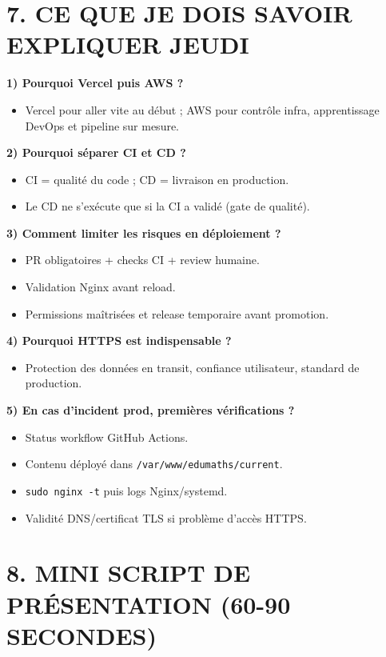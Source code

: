 \documentclass[10pt,a4paper]{article}
\begin{document}
\section{7. CE QUE JE DOIS SAVOIR EXPLIQUER JEUDI}

\textbf{1) Pourquoi Vercel puis AWS ?}
\begin{itemize}
  \item Vercel pour aller vite au d\'ebut ; AWS pour contr\^ole infra, apprentissage DevOps et pipeline sur mesure.
\end{itemize}

\textbf{2) Pourquoi s\'eparer CI et CD ?}
\begin{itemize}
  \item CI = qualit\'e du code ; CD = livraison en production.
  \item Le CD ne s'ex\'ecute que si la CI a valid\'e (gate de qualit\'e).
\end{itemize}

\textbf{3) Comment limiter les risques en d\'eploiement ?}
\begin{itemize}
  \item PR obligatoires + checks CI + review humaine.
  \item Validation Nginx avant reload.
  \item Permissions ma\^itris\'ees et release temporaire avant promotion.
\end{itemize}

\textbf{4) Pourquoi HTTPS est indispensable ?}
\begin{itemize}
  \item Protection des donn\'ees en transit, confiance utilisateur, standard de production.
\end{itemize}

\textbf{5) En cas d'incident prod, premi\`eres v\'erifications ?}
\begin{itemize}
  \item Status workflow GitHub Actions.
  \item Contenu d\'eploy\'e dans \texttt{/var/www/edumaths/current}.
  \item \texttt{sudo nginx -t} puis logs Nginx/systemd.
  \item Validit\'e DNS/certificat TLS si probl\`eme d'acc\`es HTTPS.
\end{itemize}

\section{8. MINI SCRIPT DE PR\'ESENTATION (60-90 SECONDES)}
\end{document}
